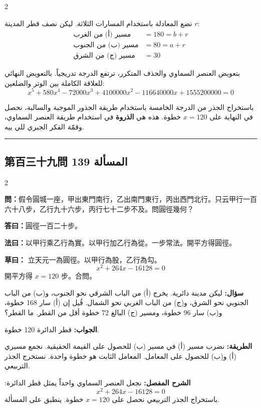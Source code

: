 \documentclass[11pt,a4paper]{article}
\newcommand{\ar}[1]{\arabicfont\beginR #1\endR}
\newcommand{\arb}[1]{\textbf{\arabicfont\beginR #1\endR}}
\newcommand{\longline}{\noindent\rule{\textwidth}{0.4pt}}
\newcommand{\arnote}[1]{\textcolor{arabicblue}{\ar{#1}}}
\newcommand{\wen}[1]{\par\noindent\textbf{\textcolor{probcolor}{問：}}{#1}\par}
\newcommand{\da}[1]{\par\noindent\textbf{\textcolor{anscolor}{答曰：}}{#1}\par}
\newcommand{\fayue}[1]{\par\noindent\textbf{\textcolor{methodcolor}{法曰：}}{#1}\par}
\newcommand{\caoyue}[1]{\par\noindent\textbf{草曰：}{#1}\par}
\newcommand{\arwen}[1]{\par\noindent\arb{سؤال: }\arnote{#1}\par}
\newcommand{\arjwb}[1]{\par\noindent\arb{الجواب: }\arnote{#1}\par}
\newcommand{\arqwd}[1]{\par\noindent\arb{الطريقة: }\arnote{#1}\par}
\newcommand{\arshr}[1]{\par\noindent\arb{الشرح المفصل: }\arnote{#1}\par}
\begin{document}
\begin{paracol}{2}
\begin{rightcolumn}
{نضع المعادلة باستخدام المسارات الثلاثة. ليكن نصف قطر المدينة $r$:
\begin{align*}
\text{مسير (أ) من الغرب} &= 180 = b + r \\
\text{مسير (ب) من الجنوب} &= 80 = a + r \\
\text{مسير (ج) من الشرق} &= 30
\end{align*}

بتعويض العنصر السماوي والحذف المتكرر، ترتفع الدرجة تدريجياً. بالتعويض النهائي للعلاقة الكاملة بين الوتر والضلعين:
$$x^5 + 580x^4 - 72000x^3 + 4100000x^2 - 116640000x + 1555200000 = 0$$

باستخراج الجذر من الدرجة الخامسة باستخدام طريقة الجذور الموجبة والسالبة، نحصل في النهاية على $x = 120$ خطوة. هذه هي \textbf{الذروة} في استخدام طريقة العنصر السماوي، وقمّة الفكر الجبري للي ييه.}
\end{rightcolumn}

\end{paracol}

\vspace{0.3cm}
\longline

\subsection*{第百三十九問 \hfill \ar{المسألة 139}}

\begin{paracol}{2}

\begin{leftcolumn}
\wen{假令圓城一座，甲出東門南行，乙出南門東行，丙出西門北行。只云甲行一百六十八步，乙行九十六步，丙行七十二步不及。問圓徑幾何？}

\da{圓徑一百二十步。}

\fayue{以甲行乘乙行為實。以甲行加乙行為從。一步常法。開平方得圓徑。}

\caoyue{
立天元一為圓徑。以甲行為股，乙行為勾。
$$x^2 + 264x - 16128 = 0$$
開平方得 $x = 120$ 步。合問。}
\end{leftcolumn}

\begin{rightcolumn}
\arwen{ليكن مدينة دائرية. يخرج (أ) من الباب الشرقي نحو الجنوب، و(ب) من الباب الجنوبي نحو الشرق، و(ج) من الباب الغربي نحو الشمال. قُيل إن (أ) سار 168 خطوة، و(ب) سار 96 خطوة، ومسير (ج) البالغ 72 خطوة أقل من القطر. ما القطر؟}

\arjwb{قطر الدائرة 120 خطوة.}

\arqwd{نضرب مسير (أ) في مسير (ب) للحصول على القيمة الحقيقية. نجمع مسيري (أ) و(ب) للحصول على المعامل. المعامل الثابت هو خطوة واحدة. نستخرج الجذر التربيعي.}

\arshr{نجعل العنصر السماوي واحداً يمثل قطر الدائرة:
$$x^2 + 264x - 16128 = 0$$
باستخراج الجذر التربيعي نحصل على $x = 120$ خطوة. ينطبق على المسألة.}
\end{rightcolumn}

\end{paracol}
\end{document}
